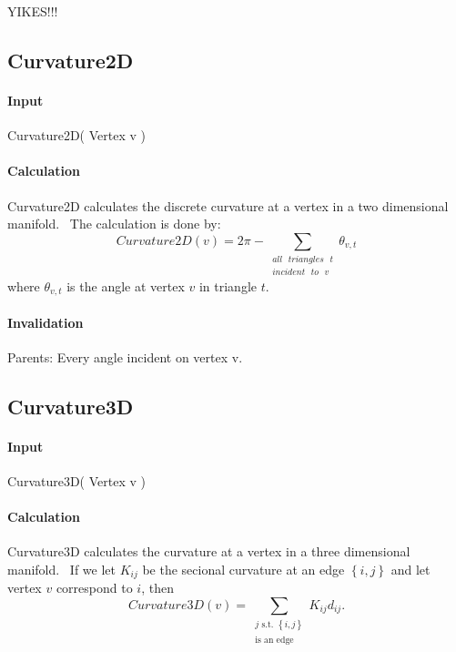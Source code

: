 YIKES!!!

\subsection{Curvature2D}

\paragraph{Input}

Curvature2D( Vertex v )

\paragraph{Calculation}

Curvature2D calculates the discrete curvature at a vertex in a two
dimensional manifold. \ The calculation is done by:%
\begin{equation*}
Curvature2D\left( v\right) =2\pi -\sum\limits_{\substack{ all\text{ }%
triangles\text{ }t  \\ incident\text{ }to\text{ }v}}\theta _{v,t}
\end{equation*}%
where $\theta _{v,t}$ is the angle at vertex $v$ in triangle $t$. \ 

\paragraph{Invalidation}

\bigskip Parents: Every angle incident on vertex v.

\subsection{Curvature3D}

\paragraph{Input}

Curvature3D( Vertex v )

\paragraph{Calculation}

Curvature3D calculates the curvature at a vertex in a three dimensional
manifold. \ If we let $K_{ij}$ be the secional curvature at an edge $\left\{
i,j\right\} $ and let vertex $v$ correspond to $i$, then%
\begin{equation*}
Curvature3D\left( v\right) =\sum\limits_{\substack{ j\text{ s.t. }\left\{
i,j\right\}  \\ \text{is an edge}}}K_{ij}d_{ij}.
\end{equation*}

